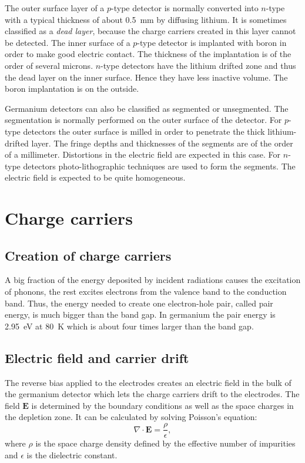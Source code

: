 The outer surface layer of a $p$-type detector is normally converted into $n$-type with a typical thickness of about 0.5~mm by diffusing lithium. It is sometimes classified as a \textit{dead layer}, because the charge carriers created in this layer cannot be detected. The inner surface of a $p$-type detector is implanted with boron in order to make good electric contact. The thickness of the implantation is of the order of several microns. $n$-type detectors have the lithium drifted zone and thus the dead layer on the inner surface. Hence they have less inactive volume. The boron implantation is on the outside.

Germanium detectors can also be classified as segmented or unsegmented. The segmentation is normally performed on the outer surface of the detector. For $p$-type detectors the outer surface is milled in order to penetrate the thick lithium-drifted layer. The fringe depths and thicknesses of the segments are of the order of a millimeter. Distortions in the electric field are expected in this case. For $n$-type detectors photo-lithographic techniques are used to form the segments. The electric field is expected to be quite homogeneous.

\section{Charge carriers}
\label{sec:det:drift}

\subsection{Creation of charge carriers}
\label{sec:det:exit}
A big fraction of the energy deposited by incident radiations causes the excitation of phonons, the rest excites electrons from the valence band to the conduction band. Thus, the energy needed to create one electron-hole pair, called pair energy, is much bigger than the band gap. In germanium the pair energy is 2.95~eV at 80~K which is about four times larger than the band gap.

\subsection{Electric field and carrier drift}
\label{sec:det:field}
The reverse bias applied to the electrodes creates an electric field in the bulk of the germanium detector which lets the charge carriers drift to the electrodes. The field $\mathbf{E}$ is determined by the boundary conditions as well as the space charges in the depletion zone. It can be calculated by solving Poisson's equation:
\begin{equation} 
\label{eq:det:ef}
\nabla \cdot \mathbf{E} = \frac{\rho}{\epsilon},  
\end{equation}
where $\rho$ is the space charge density defined by the effective number of impurities and $\epsilon$ is the dielectric constant.

